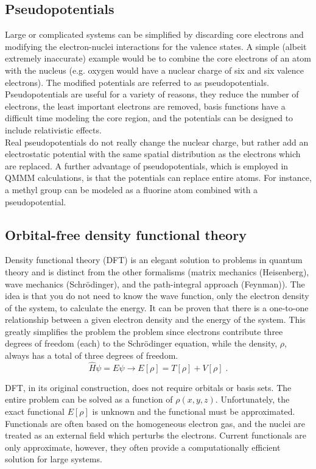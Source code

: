 \documentclass[12pt]{report}
\begin{document}
\subsection{Pseudopotentials}

Large or complicated systems can be simplified by discarding core electrons
and modifying the electron-nuclei interactions for the valence states. A
simple (albeit extremely inaccurate) example would be to combine the core
electrons of an atom with the nucleus (e.g. oxygen would have a nuclear charge
of six and six valence electrons). The modified potentials are referred to as
pseudopotentials. Pseudopotentials are useful for a variety of reasons, they
reduce the number of electrons, the least important electrons are removed,
basis functions have a difficult time modeling the core region, and the
potentials can be designed to include relativistic effects. \\

Real pseudopotentials do not really change the nuclear charge, but rather add
an electrostatic potential with the same spatial distribution as the electrons
which are replaced. A further advantage of pseudopotentials, which is employed
in QMMM calculations, is that the potentials can replace entire atoms. For
instance, a methyl group can be modeled as a fluorine atom combined with a
pseudopotential.

\subsection{Orbital-free density functional theory}

Density functional theory (DFT) is an elegant solution to problems in quantum
theory and is distinct from the other formalisms (matrix mechanics
(Heisenberg), wave mechanics (Schr\"{o}dinger), and the path-integral approach
(Feynman)). The idea is that you do not need to know the wave function, only
the electron density of the system, to calculate the energy. It can be proven
that there is a one-to-one relationship between a given electron density and
the energy of the system. This greatly simplifies the problem the problem
since electrons contribute three degrees of freedom (each) to the
Schr\"{o}dinger equation, while the density, $\rho$, always has a total of
three degrees of freedom.
\begin{equation}
 \hat H\psi=E\psi \to E[\rho] = T[\rho]+V[\rho] \; .
\end{equation}

DFT, in its original construction, does not require orbitals or basis sets.
The entire problem can be solved as a function of $\rho(x,y,z)$.
Unfortunately, the exact functional $E[\rho]$ is unknown and the functional
must be approximated. Functionals are often based on the homogeneous electron
gas, and the nuclei are treated as an external field which perturbs the
electrons. Current functionals are only approximate, however, they often
provide a computationally efficient solution for large systems. \\
\end{document}
